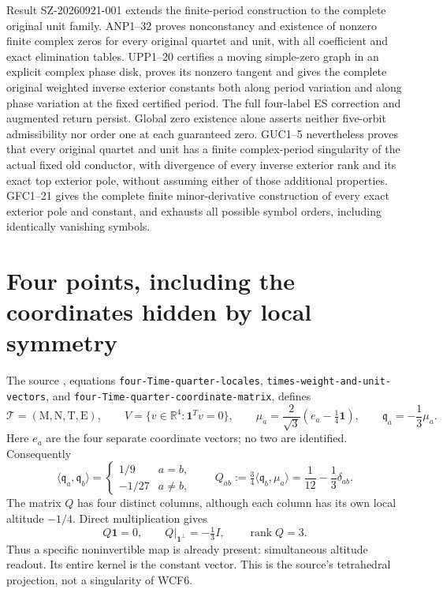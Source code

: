 \documentclass[11pt]{article}
\newcommand{\R}{\mathbb R}
\newcommand{\rank}{\operatorname{rank}}
\begin{document}
Result SZ-20260921-001 extends the finite-period construction to the
complete original unit family. ANP1--32 proves nonconstancy and existence
of nonzero finite complex zeros for every original quartet and unit,
with all coefficient and exact elimination tables. UPP1--20 certifies
a moving simple-zero graph in an explicit complex phase disk, proves
its nonzero tangent and gives the complete original weighted inverse
exterior constants both along period variation and along phase variation
at the fixed certified period. The full four-label ES correction and
augmented return persist. Global zero existence alone asserts neither
five-orbit admissibility nor order one at each guaranteed zero.
GUC1--5 nevertheless proves that every original quartet and unit has
a finite complex-period singularity of the actual fixed old conductor,
with divergence of every inverse exterior rank and its exact top
exterior pole, without assuming either of those additional properties.
GFC1--21 gives the complete finite minor-derivative construction of
every exact exterior pole and constant, and exhausts all possible
symbol orders, including identically vanishing symbols.

\section{Four points, including the coordinates hidden by local symmetry}
The source \cite{ES}, equations \texttt{four-Time-quarter-locales},
\texttt{times-weight-and-unit-vectors}, and
\texttt{four-Time-quarter-coordinate-matrix}, defines
\[
 \mathcal T=(\mathrm M,\mathrm N,\mathrm T,\mathrm E),\qquad
 V=\{v\in\R^4:\mathbf1^Tv=0\},\qquad
 \mu_a=\frac2{\sqrt3}(e_a-\tfrac14\mathbf1),\qquad
 \mathfrak q_a=-\frac13\mu_a.
 \tag{FC1}
\]
Here $e_a$ are the four separate coordinate vectors; no two are identified.
Consequently
\[
 \langle\mathfrak q_a,\mathfrak q_b\rangle
 =\begin{cases}1/9&a=b,\\-1/27&a\ne b,\end{cases}
 \qquad
 Q_{ab}:=\tfrac34\langle\mathfrak q_b,\mu_a\rangle
 =\frac1{12}-\frac13\delta_{ab}.
 \tag{FC2}
\]
The matrix $Q$ has four distinct columns, although each column has its
own local altitude $-1/4$. Direct multiplication gives
\[
 Q\mathbf1=0,\qquad Q|_{\mathbf1^\perp}=-\tfrac13 I,
 \qquad \rank Q=3.
 \tag{FC3}
\]
Thus a specific noninvertible map is already present: simultaneous
altitude readout. Its entire kernel is the constant vector. This is the
source's tetrahedral projection, not a singularity of WCF6.
\end{document}
